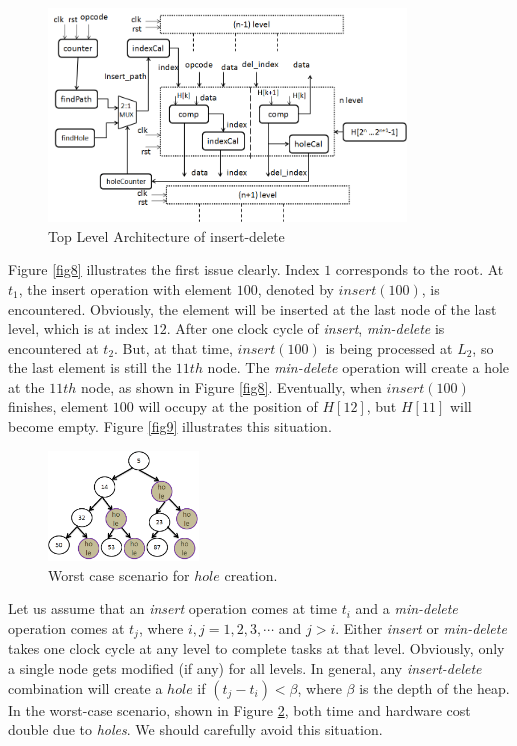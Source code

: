 \documentclass[10pt, conference, compsocconf]{IEEEtran}
\begin{document}
\begin{figure}[!ht]
  \centering
  \includegraphics[width=9.5cm]{Figures/2.png}
      \caption{Top Level Architecture of insert-delete}
    \label{fig10}
\end{figure}

Figure \ref{fig8} illustrates the first issue clearly.
Index $1$ corresponds to the root.
At $t_1$, the insert operation with element $100$, denoted by $insert(100)$, is encountered.
Obviously, the element will be inserted at the last node of the last level, which is at index $12$.
After one clock cycle of {\it insert}, {\it min-delete} is encountered at $t_2$.
But, at that time, $insert(100)$ is being processed at $L_2$, so the last element is still the $11th$ node.
The {\it min-delete} operation will create a hole at the $11th$ node, as shown in Figure \ref{fig8}.
Eventually, when $insert(100)$ finishes, element $100$ will occupy at the position of $H[12]$, but $H[11]$ will become empty. 
Figure \ref{fig9} illustrates this situation.

\begin{figure}[!ht]
  \centering
  \includegraphics[width=4cm]{Figures/hole.png}
      \caption{Worst case scenario for $hole$ creation.}
    \label{hole}
\end{figure}

Let us assume that an {\it insert} operation comes at time $t_i$ and a {\it min-delete} operation comes at $t_j$, where $i, j = 1,2,3, \cdots$ and $j>i$.
Either {\it insert} or {\it min-delete} takes one clock cycle at any level to complete tasks at that level.
Obviously, only a single node gets modified (if any) for all levels.
In general, any {\it insert-delete} combination will create a $hole$ if $(t_j - t_i) < \beta$, where $\beta$ is the depth of the heap.
In the worst-case scenario, shown in Figure \ref{hole}, both time and hardware cost double due to {\it holes}. We should carefully avoid this situation.
\end{document}
